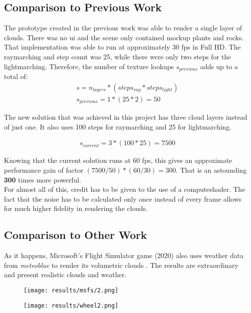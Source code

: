 \subsection{Comparison to Previous Work}
\label{section:techimpl:comparison}
The prototype created in the previous work was able to render a single layer of clouds. There was no \gls{ui} and the scene only contained mockup plants and rocks.
That implementation was able to run at approximately 30 \gls{fps} in Full HD. The \gls{raymarching} and step count was 25, while there were only two steps for the \gls{lightmarching}.
Therefore, the number of texture lookups $s_{previous}$ adds up to a total of:
$$
\begin{array}{l}
    s = n_{layers} * (steps_{ray} * steps_{light}) \\
    s_{previous} = 1 * (25 * 2) = 50
\end{array}
$$

\noindent
The new solution that was achieved in this project has three cloud layers instead of just one.
It also uses 100 steps for \gls{raymarching} and 25 for \gls{lightmarching}.

$$
\begin{array}{l}
    s_{current} = 3 * (100 * 25) = 7500
\end{array}
$$

\noindent
Knowing that the current solution runs at 60 \gls{fps}, this gives an approximate performance gain of factor $(7500 / 50) * (60/30) = 300$.
That is an astounding \textbf{300} times more powerful.
\\
For almost all of this, credit has to be given to the use of a \gls{computeshader}.
The fact that the \gls{noise} has to be calculated only once instead of every frame allows for much higher fidelity in rendering the clouds.

\clearpage

\subsection{Comparison to Other Work}
As it happens, Microsoft's Flight Simulator game (2020) also uses weather data from \emph{meteoblue} to render its \gls{volumetric} clouds \cite{meteoblue:msfs}.
The results are extraordinary and present realistic clouds and weather.

\begin{figure}[H]
    \centering
        \begin{minipage}{0.47\linewidth}
            \texttt{[image: results/msfs/2.png]}
            \label{img:msfs:1}
        \end{minipage}
    \hfill
        \begin{minipage}{0.47\linewidth}
            \texttt{[image: results/wheel2.png]}
            \label{img:msfs:2}
        \end{minipage}
\end{figure}


